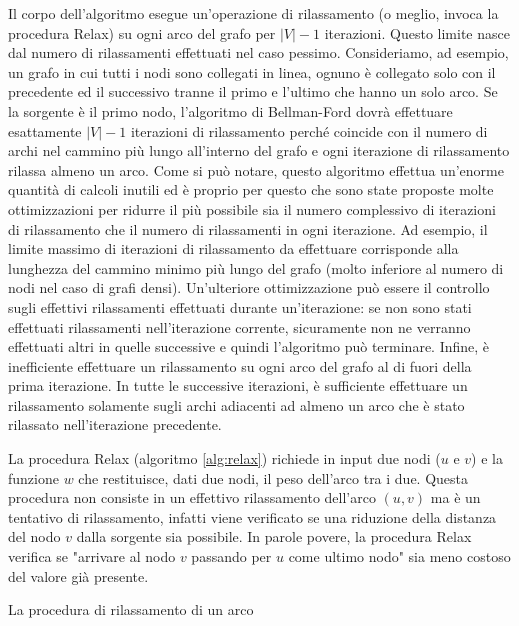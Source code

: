 \documentclass[12pt,a4paper,oneside]{book}
\begin{document}
	Il corpo dell'algoritmo esegue un'operazione di rilassamento (o meglio, invoca la procedura Relax) su ogni arco del grafo per $|V|-1$ iterazioni. Questo limite nasce dal numero di rilassamenti effettuati nel caso pessimo. Consideriamo, ad esempio, un grafo in cui tutti i nodi sono collegati in linea, ognuno è collegato solo con il precedente ed il successivo tranne il primo e l'ultimo che hanno un solo arco. Se la sorgente è il primo nodo, l'algoritmo di Bellman-Ford dovrà effettuare esattamente $|V|-1$ iterazioni di rilassamento perché coincide con il numero di archi nel cammino più lungo all'interno del grafo e ogni iterazione di rilassamento rilassa almeno un arco. Come si può notare, questo algoritmo effettua un'enorme quantità di calcoli inutili ed è proprio per questo che sono state proposte molte ottimizzazioni per ridurre il più possibile sia il numero complessivo di iterazioni di rilassamento che il numero di rilassamenti in ogni iterazione. Ad esempio, il limite massimo di iterazioni di rilassamento da effettuare corrisponde alla lunghezza del cammino minimo più lungo del grafo (molto inferiore al numero di nodi nel caso di grafi densi). Un'ulteriore ottimizzazione può essere il controllo sugli effettivi rilassamenti effettuati durante un'iterazione: se non sono stati effettuati rilassamenti nell'iterazione corrente, sicuramente non ne verranno effettuati altri in quelle successive e quindi l'algoritmo può terminare. Infine, è inefficiente effettuare un rilassamento su ogni arco del grafo al di fuori della prima iterazione. In tutte le successive iterazioni, è sufficiente effettuare un rilassamento solamente sugli archi adiacenti ad almeno un arco che è stato rilassato nell'iterazione precedente.
	
	La procedura Relax (algoritmo \ref{alg:relax}) richiede in input due nodi ($u$ e $v$) e la funzione $w$ che restituisce, dati due nodi, il peso dell'arco tra i due. Questa procedura non consiste in un effettivo rilassamento dell'arco $(u,v)$ ma è un tentativo di rilassamento, infatti viene verificato se una riduzione della distanza del nodo $v$ dalla sorgente sia possibile. In parole povere, la procedura Relax verifica se "arrivare al nodo $v$ passando per $u$ come ultimo nodo" sia meno costoso del valore già presente.
	
	\begin{algorithm}
		\caption{La procedura di rilassamento di un arco}
		\label{alg:relax}
	\end{algorithm}
	
\end{document}

